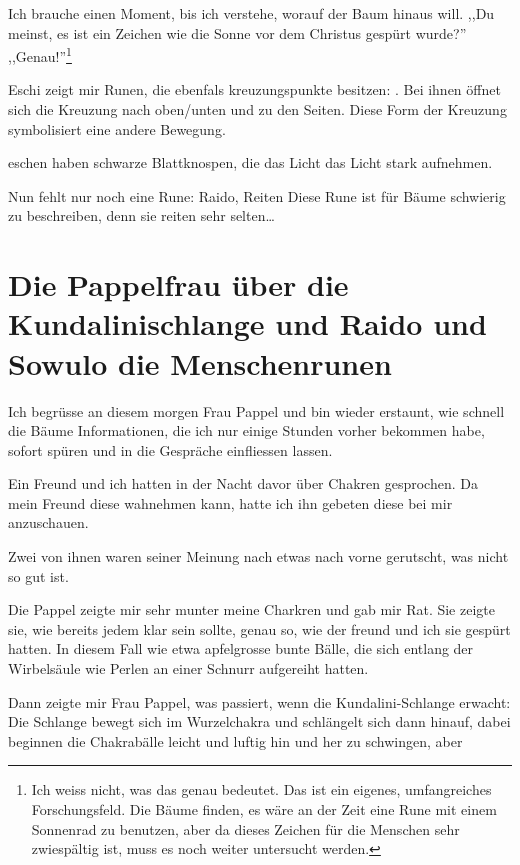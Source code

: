 \documentclass[11pt,titlepage,a5paper]{book}
\begin{document}
Ich brauche einen Moment, bis ich verstehe, worauf der Baum hinaus will. ,,Du meinst, es ist ein Zeichen wie die Sonne vor dem Christus gespürt wurde?'' ,,Genau!''\footnote{Ich weiss nicht, was das genau bedeutet. Das ist ein eigenes, umfangreiches Forschungsfeld. Die Bäume finden, es wäre an der Zeit eine Rune mit einem Sonnenrad zu benutzen, aber da dieses Zeichen für die Menschen sehr zwiespältig ist, muss es noch weiter untersucht werden.}

Eschi zeigt mir Runen, die ebenfals kreuzungspunkte besitzen: . Bei ihnen öffnet sich die Kreuzung nach oben/unten und zu den Seiten. Diese Form der Kreuzung symbolisiert eine andere Bewegung.

eschen haben schwarze Blattknospen, die das Licht das Licht stark aufnehmen. 

Nun fehlt nur  noch eine Rune: Raido, Reiten
Diese Rune ist für Bäume schwierig zu beschreiben, denn sie reiten sehr selten\dots

\section*{Die Pappelfrau über die Kundalinischlange und Raido  und Sowulo  die Menschenrunen }

Ich begrüsse an diesem morgen Frau Pappel und bin wieder erstaunt, wie schnell die Bäume Informationen, die ich nur einige Stunden vorher bekommen habe, sofort spüren und in die Gespräche einfliessen lassen.

Ein Freund und ich hatten in der Nacht davor über Chakren gesprochen. Da mein Freund diese wahnehmen kann, hatte ich ihn gebeten diese bei mir anzuschauen.

Zwei von ihnen waren seiner Meinung nach etwas nach vorne gerutscht, was nicht so gut ist.

Die Pappel zeigte mir sehr munter meine Charkren und gab mir Rat. Sie zeigte sie, wie bereits jedem klar sein sollte, genau so, wie der freund und ich sie gespürt hatten. In diesem Fall wie etwa apfelgrosse bunte Bälle, die sich entlang der Wirbelsäule wie Perlen an einer Schnurr aufgereiht hatten.

Dann zeigte mir Frau Pappel, was passiert, wenn die Kundalini-Schlange erwacht: Die Schlange bewegt sich im Wurzelchakra und schlängelt sich dann hinauf, dabei beginnen die Chakrabälle leicht und luftig hin und her zu schwingen, aber
\end{document}
